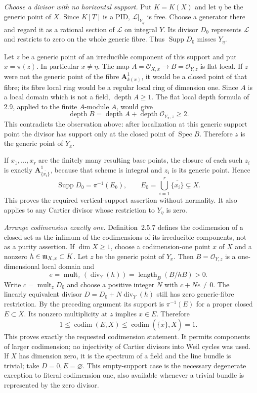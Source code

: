 \documentclass[11pt]{article}
\begin{document}
\emph{Choose a divisor with no horizontal support.} Put $K=K(X)$ and let $\eta$ be the generic point of $X$. Since $K[T]$ is a PID, $\mathcal L|_{Y_\eta}$ is free. Choose a generator there and regard it as a rational section of $\mathcal L$ on integral $Y$. Its divisor $D_0$ represents $\mathcal L$ and restricts to zero on the whole generic fibre. Thus $\operatorname{Supp}D_0$ misses $Y_\eta$.

Let $z$ be a generic point of an irreducible component of this support and put $x=\pi(z)$. In particular $x\ne\eta$. The map $A=\mathcal O_{X,x}\to B=\mathcal O_{Y,z}$ is flat local. If $z$ were not the generic point of the fibre $\mathbf A^1_{k(x)}$, it would be a closed point of that fibre; its fibre local ring would be a regular local ring of dimension one. Since $A$ is a local domain which is not a field, $\operatorname{depth}A\ge1$. The flat local depth formula of 2.9, applied to the finite $A$-module $A$, would give
\[ \operatorname{depth}B=\operatorname{depth}A+
\operatorname{depth}\mathcal O_{Y_x,z}\ge2. \]
This contradicts the observation above: after localization at this generic support point the divisor has support only at the closed point of $\operatorname{Spec}B$. Therefore $z$ is the generic point of $Y_x$.

If $x_1,\ldots,x_r$ are the finitely many resulting base points, the closure of each such $z_i$ is exactly $\mathbf A^1_{\overline{\{x_i\}}}$, because that scheme is integral and $z_i$ is its generic point. Hence
\[ \operatorname{Supp}D_0=\pi^{-1}(E_0),\qquad
E_0=\bigcup_{i=1}^r\overline{\{x_i\}}\subsetneq X. \]
This proves the required vertical-support assertion without normality. It also applies to any Cartier divisor whose restriction to $Y_\eta$ is zero.

\emph{Arrange codimension exactly one.} Definition~2.5.7 defines the codimension of a closed set as the infimum of the codimensions of its irreducible components, not as a purity assertion. If $\dim X\ge1$, choose a codimension-one point $x$ of $X$ and a nonzero $h\in\mathfrak m_{X,x}\subset K$. Let $z$ be the generic point of $Y_x$. Then $B=\mathcal O_{Y,z}$ is a one-dimensional local domain and
\[ e=\operatorname{mult}_z(\operatorname{div}_Y(h))
  =\operatorname{length}_B(B/hB)>0. \]
Write $c=\operatorname{mult}_zD_0$ and choose a positive integer $N$ with $c+Ne\ne0$. The linearly equivalent divisor $D=D_0+N\operatorname{div}_Y(h)$ still has zero generic-fibre restriction. By the preceding argument its support is $\pi^{-1}(E)$ for a proper closed $E\subset X$. Its nonzero multiplicity at $z$ implies $x\in E$. Therefore
\[ 1\le\operatorname{codim}(E,X)\le\operatorname{codim}(\overline{\{x\}},X)=1. \]
This proves exactly the requested codimension statement. It permits components of larger codimension; no injectivity of Cartier divisors into Weil cycles was used. If $X$ has dimension zero, it is the spectrum of a field and the line bundle is trivial; take $D=0,E=\varnothing$. This empty-support case is the necessary degenerate exception to literal codimension one, also available whenever a trivial bundle is represented by the zero divisor.
\end{document}
